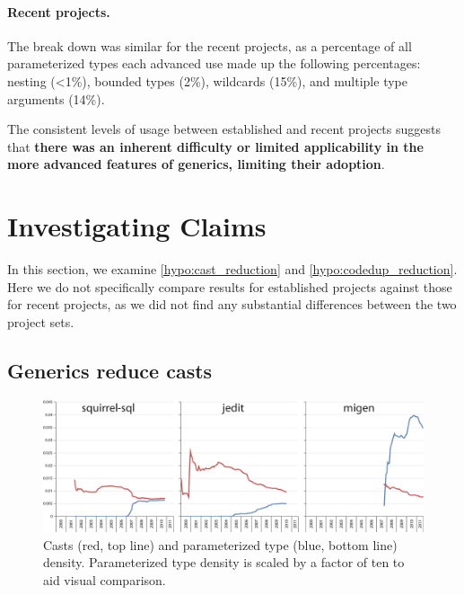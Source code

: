 \documentclass{svjour3}
\newcommand{\todo}[1]{}
\begin{document}
\paragraph{Recent projects.}The break down was similar for the recent projects, as a percentage of all parameterized types  
each advanced use made up the following percentages:
nesting (\textless 1\%),
bounded types (2\%), 
wildcards (15\%), and
multiple type arguments (14\%).

The consistent levels of usage between established and recent projects suggests that \textbf{there was an inherent difficulty or limited applicability in the more advanced features of generics, 
limiting their adoption}.

\section{Investigating Claims}\label{sec:claims}

In this section, we examine \autoref{hypo:cast_reduction} and 
\autoref{hypo:codedup_reduction}.
Here we do not specifically compare results for 
established projects against those for recent projects,
as we did not find any substantial
differences between the two project sets.

\subsection{Generics reduce casts}\label{sec:castsvsgenerics}


\begin{figure}

	\centering
	\includegraphics[width=\textwidth]{casts_vs_generics}
	
	\caption{Casts (red, top line) and parameterized 
	type (blue, bottom line) density.  Parameterized type density is scaled
    by a factor of ten to aid visual comparison.}\label{fig:casts_vs_generics}
	\todo{use different colors}
\end{figure}
\end{document}
